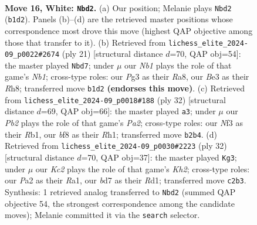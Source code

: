 \documentclass[11pt]{article}
\begin{document}
\clearpage

\begin{figure}[p]\centering
\begin{subfigure}{0.46\textwidth}\centering
\resizebox{\linewidth}{!}{%
\newchessgame
\chessboard[
  setfen={1r2kb1r/1p1b2pp/p1n1p3/4Pp2/n7/4BNP1/PPK2P1P/RN3BR1 w k f6 0 16},
  showmover=false,
  pgfstyle=straightmove, color=movearrow, markmove={b1-d2}
]}
\caption{}
\end{subfigure}\hfill
\begin{subfigure}{0.46\textwidth}\centering
\resizebox{\linewidth}{!}{%
\newchessgame
\chessboard[
  setfen={rn2k2r/p4ppp/2p2n2/1pb1p3/4P3/2NB1P1P/PPPB3P/R3K2R b KQ - 1 11},
  showmover=false,
  pgfstyle=straightmove, color=movearrow, markmove={b8-d7}
]}
\caption{}
\end{subfigure}
\\[4pt]
\begin{subfigure}{0.46\textwidth}\centering
\resizebox{\linewidth}{!}{%
\newchessgame
\chessboard[
  setfen={2k4r/p1pr1ppp/bp2pb2/8/1n2P1KP/4B1P1/PPP2PB1/1R2N2R w - - 13 17},
  showmover=false,
  pgfstyle=straightmove, color=movearrow, markmove={a2-a3}
]}
\caption{}
\end{subfigure}\hfill
\begin{subfigure}{0.46\textwidth}\centering
\resizebox{\linewidth}{!}{%
\newchessgame
\chessboard[
  setfen={r3kb1r/1ppb1pp1/2p3np/4P3/N2N2P1/1P5P/P1P2P1K/R1BR4 w - - 1 17},
  showmover=false,
  pgfstyle=straightmove, color=movearrow, markmove={h2-g3}
]}
\caption{}
\end{subfigure}
\caption{\textbf{Move 16, White: \texttt{Nbd2}.} (a) Our position; Melanie plays \texttt{Nbd2} (\texttt{b1d2}). Panels (b)--(d) are the retrieved master positions whose correspondence most drove this move (highest QAP objective among those that transfer to it). (b) Retrieved from \texttt{lichess\_elite\_2024-09\_p0022\#2674} (ply 21) [structural distance $d$=70, QAP obj=54]: the master played \texttt{Nbd7}; under $\mu$ our \emph{Nb1} plays the role of that game's \emph{Nb1}; cross-type roles: our \emph{P}g3 as their \emph{R}a8, our \emph{B}e3 as their \emph{R}h8; transferred move \texttt{b1d2} \textbf{(endorses this move)}. (c) Retrieved from \texttt{lichess\_elite\_2024-09\_p0018\#188} (ply 32) [structural distance $d$=69, QAP obj=66]: the master played \texttt{a3}; under $\mu$ our \emph{Pb2} plays the role of that game's \emph{Pa2}; cross-type roles: our \emph{N}f3 as their \emph{R}b1, our \emph{b}f8 as their \emph{R}h1; transferred move \texttt{b2b4}. (d) Retrieved from \texttt{lichess\_elite\_2024-09\_p0030\#2223} (ply 32) [structural distance $d$=70, QAP obj=37]: the master played \texttt{Kg3}; under $\mu$ our \emph{Kc2} plays the role of that game's \emph{Kh2}; cross-type roles: our \emph{P}a2 as their \emph{R}a1, our \emph{b}d7 as their \emph{R}d1; transferred move \texttt{c2b3}. Synthesis: 1 retrieved analog transferred to \texttt{Nbd2} (summed QAP objective 54, the strongest correspondence among the candidate moves); Melanie committed it via the \texttt{search} selector.}
\label{fig:thought-m30}
\end{figure}
\end{document}
